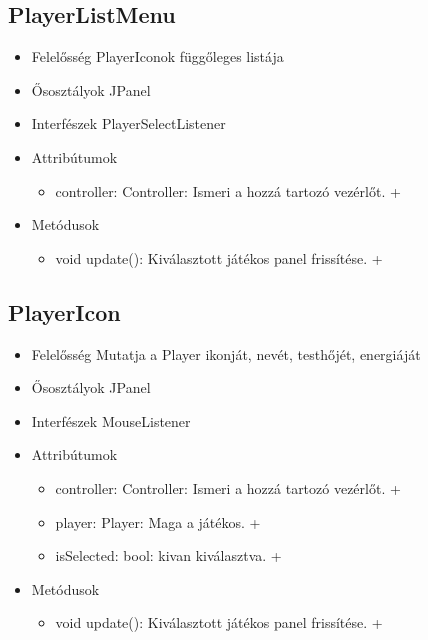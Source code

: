 \subsection{PlayerListMenu}
\begin{itemize}
	\item Felelősség\newline
	PlayerIconok függőleges listája
	\item Ősosztályok\newline
	JPanel
	\item Interfészek\newline
	PlayerSelectListener
	\item Attribútumok\newline
	\begin{itemize}
		\item controller: Controller: Ismeri a hozzá tartozó vezérlőt. +	
	\end{itemize}
	\item Metódusok\newline
	\begin{itemize}
		\item void update(): Kiválasztott játékos panel frissítése. +
	\end{itemize}
\end{itemize}

\subsection{PlayerIcon}
\begin{itemize}
	\item Felelősség\newline
	Mutatja a Player ikonját, nevét, testhőjét, energiáját
	\item Ősosztályok\newline
	JPanel
	\item Interfészek\newline
	MouseListener
	\item Attribútumok\newline
	\begin{itemize}
		\item controller: Controller: Ismeri a hozzá tartozó vezérlőt. +	
		\item player: Player: Maga a játékos. +
		\item isSelected: bool: kivan kiválasztva. +
	\end{itemize}
	\item Metódusok\newline
	\begin{itemize}
		\item void update(): Kiválasztott játékos panel frissítése. +
	\end{itemize}
\end{itemize}

